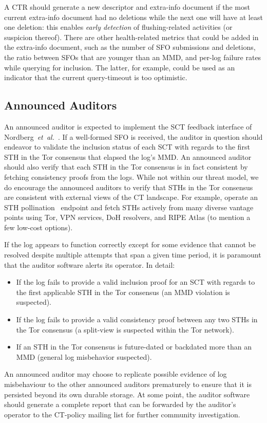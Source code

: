 A CTR should generate a new descriptor and extra-info document if the most
current extra-info document had no deletions while the next one will have at
least one deletion:
	this enables \emph{early detection} of flushing-related activities
	(or suspicion thereof).
There are other health-related metrics that could be added in the
extra-info document, such as
	the number of SFO submissions and deletions,
	the ratio between SFOs that are younger than an MMD, and
	per-log failure rates while querying for inclusion.
The latter, for example, could be used as an indicator that the current
query-timeout is too optimistic.

\subsection{Announced Auditors}
An announced auditor is expected to implement the SCT feedback interface of
Nordberg~\emph{et~al.}~\cite{nordberg}.  If a well-formed SFO is received, the
auditor in question should endeavor to validate the inclusion status of each SCT
with regards to the first STH in the Tor consensus that elapsed the log's MMD.
An announced auditor should also verify that each STH in the Tor consensus is
in fact consistent by fetching consistency proofs from the logs.
While not within our threat model, we do encourage the announced auditors to
verify that STHs in the Tor consensus are consistent with external views of the
CT landscape.  For example, operate an STH pollination~\cite{nordberg} endpoint
and fetch STHs actively from many diverse vantage points using Tor, VPN
services, DoH resolvers, and RIPE Atlas (to mention a few low-cost options).

If the log appears to function correctly except for some evidence that cannot be
resolved despite multiple attempts that span a given time period, it is
paramount that the auditor software alerts its operator.  In detail:
\begin{itemize}
	\item If the log fails to provide a valid inclusion proof for an SCT with
		regards to the first applicable STH in the Tor consensus
		(an MMD violation is suspected).
	\item If the log fails to provide a valid consistency proof between any two
		STHs in the Tor consensus
		(a split-view is suspected within the Tor network).
	\item If an STH in the Tor consensus is future-dated or backdated more than
		an MMD (general log misbehavior suspected).
\end{itemize}

An announced auditor may choose to replicate possible evidence of log
misbehaviour to the other announced auditors prematurely to ensure that
it is persisted beyond its own durable storage.  At some point, the auditor
software should generate a complete report that can be forwarded by the
auditor's operator to the CT-policy mailing list for further community
investigation.
